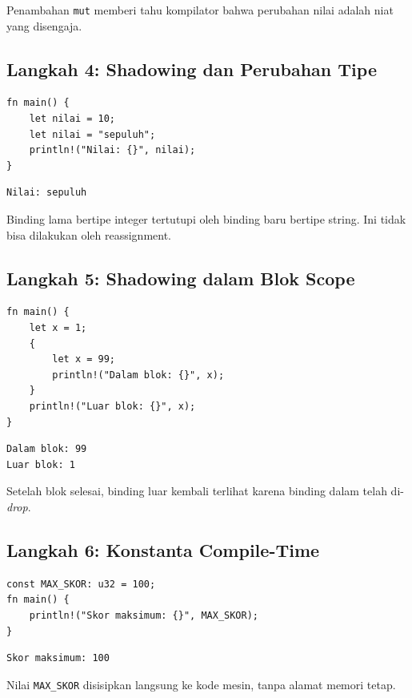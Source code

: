\documentclass[11pt,a4paper]{article}
\begin{document}
Penambahan \texttt{mut} memberi tahu kompilator bahwa perubahan nilai adalah niat yang disengaja.

\subsection{Langkah 4: Shadowing dan Perubahan Tipe}

\begin{lstlisting}[style=code]
fn main() {
    let nilai = 10;
    let nilai = "sepuluh";
    println!("Nilai: {}", nilai);
}
\end{lstlisting}

\begin{lstlisting}[style=out]
Nilai: sepuluh
\end{lstlisting}

Binding lama bertipe integer tertutupi oleh binding baru bertipe string. Ini tidak bisa dilakukan oleh reassignment.

\subsection{Langkah 5: Shadowing dalam Blok Scope}

\begin{lstlisting}[style=code]
fn main() {
    let x = 1;
    {
        let x = 99;
        println!("Dalam blok: {}", x);
    }
    println!("Luar blok: {}", x);
}
\end{lstlisting}

\begin{lstlisting}[style=out]
Dalam blok: 99
Luar blok: 1
\end{lstlisting}

Setelah blok selesai, binding luar kembali terlihat karena binding dalam telah di-\textit{drop}.

\subsection{Langkah 6: Konstanta Compile-Time}

\begin{lstlisting}[style=code]
const MAX_SKOR: u32 = 100;
fn main() {
    println!("Skor maksimum: {}", MAX_SKOR);
}
\end{lstlisting}

\begin{lstlisting}[style=out]
Skor maksimum: 100
\end{lstlisting}

Nilai \texttt{MAX\_SKOR} disisipkan langsung ke kode mesin, tanpa alamat memori tetap.
\end{document}
